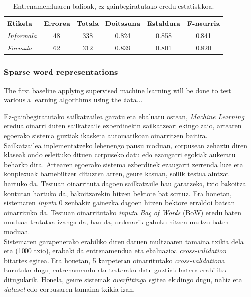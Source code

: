\documentclass[information,article,submit,moreauthors,pdftex,10pt,a4paper]{Definitions/mdpi}
\begin{document}
\begin{table}[H]
  \centering
  \begin{tabular}{|l|c|c|c|c|c|}
    \hline
    \textbf{Etiketa} &  \textbf{Errorea} & \textbf{Totala} & \textbf{Doitasuna} & \textbf{Estaldura} & \textbf{F-neurria}\\ \hline
    \textit{Informala} & 48 & 338 & 0.824  & 0.858  & 0.841\\ \hline
    \textit{Formala} & 62 & 312 & 0.839 & 0.801 & 0.820\\ \hline
  \end{tabular}
  \caption{Entrenamenduaren balioak, ez-gainbegiratutako eredu estatistikoa.}
  \label{tab:ez-gain train}
\end{table}

\subsubsection{Sparse word representations}

The first baseline applying supervised machine learning will be done to test various a learning algorithms using the data...

Ez-gainbegiratutako sailkatzailea garatu eta ebaluatu ostean, \textit{Machine Learning} eredua oinarri duten sailkatzaile ezberdinekin sailkatzeari ekingo zaio, artearen egoerako sistema guztiak ikasketa automatikoan oinarritzen baitira.\\
\indent Sailkatzailea inplementatzeko lehenengo pausu moduan, corpusean zehaztu diren klaseak ondo esleituko dituen corpuseko datu edo ezaugarri egokiak aukeratu beharko dira. Artearen egoerako sistema ezberdinek ezaugarri zerrenda luze eta konplexuak barnebiltzen dituzten arren, geure kasuan, soilik testua aintzat hartuko da. Testuan oinarrituta dagoen sailkatzaile hau garatzeko, txio bakoitza kontutan hartuko da, bakoitzarekin hitzen bektore bat sortuz. Era honetan, sistemaren \textit{input}a 0 zenbakiz gainezka dagoen hitzen bektore erraldoi batean oinarrituko da. Testuan oinarritutako \textit{input}a \textit{Bag of Words} (BoW) eredu baten moduan tratatua izango da, hau da, ordenarik gabeko hitzen multzo baten moduan.\\
\indent Sistemaren garapenerako erabiliko diren datuen multzoaren tamaina txikia dela eta (1000 txio), erabaki da entrenamendua eta ebaluazioa \textit{cross-validation} bitartez egitea. Era honetan, 5 karpetetan oinarritutako \textit{cross-validation}a burutuko dugu, entrenamendu eta testerako datu guztiak batera erabiliko ditugularik. Honela, geure sistemak \textit{overfitting}a egitea ekidingo dugu, nahiz eta \textit{dataset} edo corpusaren tamaina txikia izan.
\end{document}
